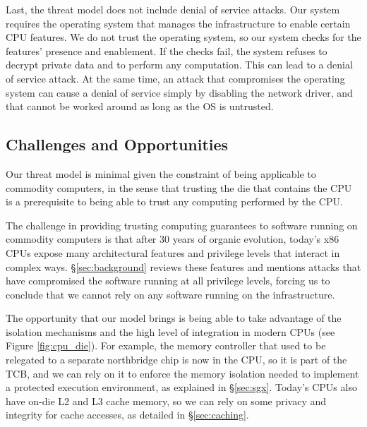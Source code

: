 Last, the threat model does not include denial of service attacks. Our system
requires the operating system that manages the infrastructure to enable certain
CPU features. We do not trust the operating system, so our system checks for
the features' presence and enablement. If the checks fail, the system refuses
to decrypt private data and to perform any computation. This can lead to a
denial of service attack. At the same time, an attack that compromises the
operating system can cause a denial of service simply by disabling the network
driver, and that cannot be worked around as long as the OS is untrusted.


\subsection{Challenges and Opportunities}

Our threat model is minimal given the constraint of being applicable to
commodity computers, in the sense that trusting the die that contains the CPU
is a prerequisite to being able to trust any computing performed by the CPU.

The challenge in providing trusting computing guarantees to software running on
commodity computers is that after 30 years of organic evolution, today's x86
CPUs expose many architectural features and privilege levels that interact in
complex ways. \S \ref{sec:background} reviews these features and mentions
attacks that have compromised the software running at all privilege levels,
forcing us to conclude that we cannot rely on any software running on the
infrastructure.

The opportunity that our model brings is being able to take advantage of the
isolation mechanisms and the high level of integration in modern CPUs (see
Figure \ref{fig:cpu_die}). For example, the memory controller that used to be
relegated to a separate northbridge chip is now in the CPU, so it is part of
the TCB, and we can rely on it to enforce the memory isolation needed to
implement a protected execution environment, as explained in \S \ref{sec:sgx}.
Today's CPUs also have on-die L2 and L3 cache memory, so we can rely on some
privacy and integrity for cache accesses, as detailed in \S \ref{sec:caching}.

